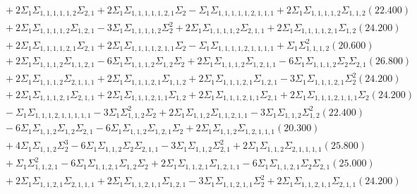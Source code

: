 \documentclass[12pt]{article}
\begin{document}
\begin{landscape}
\begin{align*}
		&\quad\quad +2\Sigma_{1}\Sigma_{1,1,1,1,1,2}\Sigma_{2,1}+2\Sigma_{1}\Sigma_{1,1,1,1,1,2,1}\Sigma_{2}-\Sigma_{1}\Sigma_{1,1,1,1,1,2,1,1,1}+2\Sigma_{1}\Sigma_{1,1,1,1,2}\Sigma_{1,1,2}(22.400) \\ 
		&\quad\quad +2\Sigma_{1}\Sigma_{1,1,1,1,2}\Sigma_{1,2,1}-3\Sigma_{1}\Sigma_{1,1,1,1,2}\Sigma_{2}^{2}+2\Sigma_{1}\Sigma_{1,1,1,1,2}\Sigma_{2,1,1}+2\Sigma_{1}\Sigma_{1,1,1,1,2,1}\Sigma_{1,2}(24.200) \\ 
		&\quad\quad +2\Sigma_{1}\Sigma_{1,1,1,1,2,1}\Sigma_{2,1}+2\Sigma_{1}\Sigma_{1,1,1,1,2,1,1}\Sigma_{2}-\Sigma_{1}\Sigma_{1,1,1,1,2,1,1,1,1}+\Sigma_{1}\Sigma_{1,1,1,2}^{2}(20.600) \\ 
		&\quad\quad +2\Sigma_{1}\Sigma_{1,1,1,2}\Sigma_{1,1,2,1}-6\Sigma_{1}\Sigma_{1,1,1,2}\Sigma_{1,2}\Sigma_{2}+2\Sigma_{1}\Sigma_{1,1,1,2}\Sigma_{1,2,1,1}-6\Sigma_{1}\Sigma_{1,1,1,2}\Sigma_{2}\Sigma_{2,1}(26.800) \\ 
		&\quad\quad +2\Sigma_{1}\Sigma_{1,1,1,2}\Sigma_{2,1,1,1}+2\Sigma_{1}\Sigma_{1,1,1,2,1}\Sigma_{1,1,2}+2\Sigma_{1}\Sigma_{1,1,1,2,1}\Sigma_{1,2,1}-3\Sigma_{1}\Sigma_{1,1,1,2,1}\Sigma_{2}^{2}(24.200) \\ 
		&\quad\quad +2\Sigma_{1}\Sigma_{1,1,1,2,1}\Sigma_{2,1,1}+2\Sigma_{1}\Sigma_{1,1,1,2,1,1}\Sigma_{1,2}+2\Sigma_{1}\Sigma_{1,1,1,2,1,1}\Sigma_{2,1}+2\Sigma_{1}\Sigma_{1,1,1,2,1,1,1}\Sigma_{2}(24.200) \\ 
		&\quad\quad -\Sigma_{1}\Sigma_{1,1,1,2,1,1,1,1,1}-3\Sigma_{1}\Sigma_{1,1,2}^{2}\Sigma_{2}+2\Sigma_{1}\Sigma_{1,1,2}\Sigma_{1,1,2,1,1}-3\Sigma_{1}\Sigma_{1,1,2}\Sigma_{1,2}^{2}(22.400) \\ 
		&\quad\quad -6\Sigma_{1}\Sigma_{1,1,2}\Sigma_{1,2}\Sigma_{2,1}-6\Sigma_{1}\Sigma_{1,1,2}\Sigma_{1,2,1}\Sigma_{2}+2\Sigma_{1}\Sigma_{1,1,2}\Sigma_{1,2,1,1,1}(20.300) \\ 
		&\quad\quad +4\Sigma_{1}\Sigma_{1,1,2}\Sigma_{2}^{3}-6\Sigma_{1}\Sigma_{1,1,2}\Sigma_{2}\Sigma_{2,1,1}-3\Sigma_{1}\Sigma_{1,1,2}\Sigma_{2,1}^{2}+2\Sigma_{1}\Sigma_{1,1,2}\Sigma_{2,1,1,1,1}(25.800) \\ 
		&\quad\quad +\Sigma_{1}\Sigma_{1,1,2,1}^{2}-6\Sigma_{1}\Sigma_{1,1,2,1}\Sigma_{1,2}\Sigma_{2}+2\Sigma_{1}\Sigma_{1,1,2,1}\Sigma_{1,2,1,1}-6\Sigma_{1}\Sigma_{1,1,2,1}\Sigma_{2}\Sigma_{2,1}(25.000) \\ 
		&\quad\quad +2\Sigma_{1}\Sigma_{1,1,2,1}\Sigma_{2,1,1,1}+2\Sigma_{1}\Sigma_{1,1,2,1,1}\Sigma_{1,2,1}-3\Sigma_{1}\Sigma_{1,1,2,1,1}\Sigma_{2}^{2}+2\Sigma_{1}\Sigma_{1,1,2,1,1}\Sigma_{2,1,1}(24.200) \\ 

\end{align*}
\end{landscape}
\end{document}
